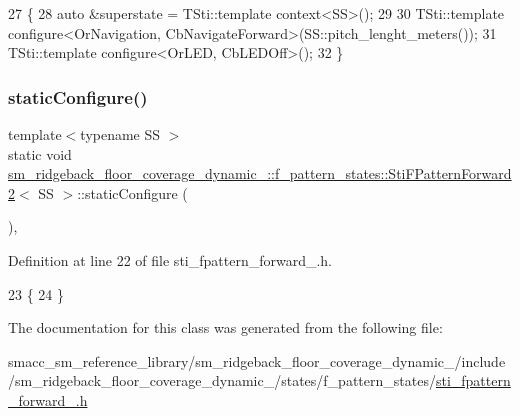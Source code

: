 \begin{DoxyCode}
27       \{
28         \textcolor{keyword}{auto} &superstate = TSti::template context<SS>();
29 
30         TSti::template configure<OrNavigation, CbNavigateForward>(SS::pitch\_lenght\_meters());
31         TSti::template configure<OrLED, CbLEDOff>();
32       \}
\end{DoxyCode}
\mbox{\label{structsm__ridgeback__floor__coverage__dynamic__1_1_1f__pattern__states_1_1StiFPatternForward2_a177855fe54dc1c81d177ad0228a285dc}} 
\subsubsection{\texorpdfstring{static\+Configure()}{staticConfigure()}}
{\footnotesize\ttfamily template$<$typename SS $>$ \\
static void \hyperlink{structsm__ridgeback__floor__coverage__dynamic__1_1_1f__pattern__states_1_1StiFPatternForward2}{sm\+\_\+ridgeback\+\_\+floor\+\_\+coverage\+\_\+dynamic\+\_\+::f\+\_\+pattern\+\_\+states\+::\+Sti\+F\+Pattern\+Forward2}$<$ SS $>$\+::static\+Configure (\begin{DoxyParamCaption}{ }\end{DoxyParamCaption})\hspace{0.3cm}{\ttfamily [inline]}, {\ttfamily [static]}}



Definition at line 22 of file sti\+\_\+fpattern\+\_\+forward\+\_.\+h.


\begin{DoxyCode}
23       \{
24       \}
\end{DoxyCode}


The documentation for this class was generated from the following file\+:\begin{DoxyCompactItemize}
\item 
smacc\+\_\+sm\+\_\+reference\+\_\+library/sm\+\_\+ridgeback\+\_\+floor\+\_\+coverage\+\_\+dynamic\+\_/include/sm\+\_\+ridgeback\+\_\+floor\+\_\+coverage\+\_\+dynamic\+\_/states/f\+\_\+pattern\+\_\+states/\hyperlink{sm__ridgeback__floor__coverage__dynamic__1_2include_2sm__ridgeback__floor__coverage__dynamic__1_0af9a1eb1ed86f74066feab2e1755244}{sti\+\_\+fpattern\+\_\+forward\+\_.\+h}\end{DoxyCompactItemize}

